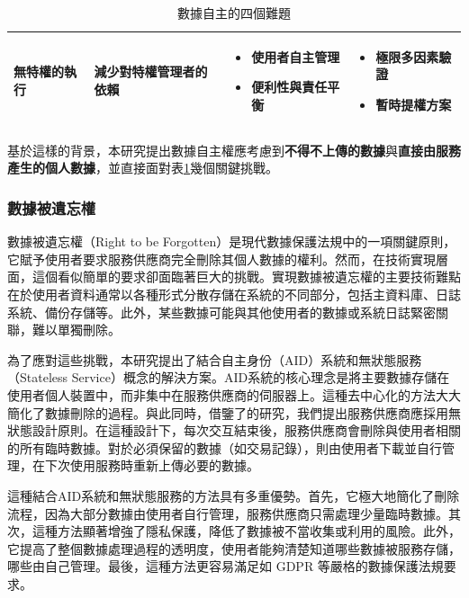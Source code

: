 \begin{table}
\begin{tabular}{>{\raggedright\arraybackslash}p{2.5cm}>{\raggedright\arraybackslash}p{2.5cm}>{\raggedright\arraybackslash}p{4cm}>{\raggedright\arraybackslash}p{4cm}}
    \addlinespace
    無特權的執行                              & 減少對特權管理者的依賴       &
    \begin{itemize}[nosep,leftmargin=*]
      \item 使用者自主管理
      \item 便利性與責任平衡
    \end{itemize} &
    \begin{itemize}[nosep,leftmargin=*]
      \item 極限多因素驗證
      \item 暫時提權方案
    \end{itemize}                                                        \\
    \bottomrule
  \end{tabular}
  \caption{數據自主的四個難題}
  \label{tab:aid-data-difficult}
\end{table}
基於這樣的背景，本研究提出數據自主權應考慮到\textbf{不得不上傳的數據}與\textbf{直接由服務產生的個人數據}，並直接面對表\ref{tab:aid-data-difficult}幾個關鍵挑戰。
\subsubsection{數據被遺忘權}
數據被遺忘權（Right to be Forgotten）是現代數據保護法規中的一項關鍵原則，它賦予使用者要求服務供應商完全刪除其個人數據的權利。然而，在技術實現層面，這個看似簡單的要求卻面臨著巨大的挑戰。實現數據被遺忘權的主要技術難點在於使用者資料通常以各種形式分散存儲在系統的不同部分，包括主資料庫、日誌系統、備份存儲等\cite{smirnova2024understanding}。此外，某些數據可能與其他使用者的數據或系統日誌緊密關聯，難以單獨刪除。

為了應對這些挑戰，本研究提出了結合自主身份（AID）系統和無狀態服務（Stateless Service）概念的解決方案。AID系統的核心理念是將主要數據存儲在使用者個人裝置中，而非集中在服務供應商的伺服器上。這種去中心化的方法大大簡化了數據刪除的過程。與此同時，借鑒了\cite{krstic2023cloud_encryption}的研究，我們提出服務供應商應採用無狀態設計原則。在這種設計下，每次交互結束後，服務供應商會刪除與使用者相關的所有臨時數據。對於必須保留的數據（如交易記錄），則由使用者下載並自行管理，在下次使用服務時重新上傳必要的數據。

這種結合AID系統和無狀態服務的方法具有多重優勢。首先，它極大地簡化了刪除流程，因為大部分數據由使用者自行管理，服務供應商只需處理少量臨時數據。其次，這種方法顯著增強了隱私保護，降低了數據被不當收集或利用的風險。此外，它提高了整個數據處理過程的透明度，使用者能夠清楚知道哪些數據被服務存儲，哪些由自己管理。最後，這種方法更容易滿足如 GDPR 等嚴格的數據保護法規要求。

